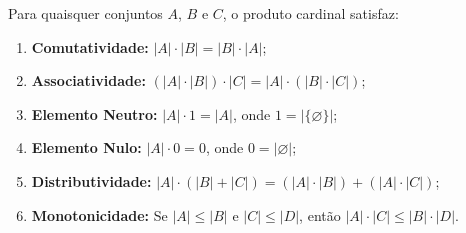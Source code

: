 \begin{proposicao}
    \label{prop:propriedades_produto_cardinal}
    Para quaisquer conjuntos \(A\), \(B\) e \(C\), o produto cardinal satisfaz:
    \begin{enumerate}
        \item \textbf{Comutatividade:} \(|A| \cdot |B| = |B| \cdot |A|\);
        \item \textbf{Associatividade:} \((|A| \cdot |B|) \cdot |C| = |A| \cdot (|B| \cdot |C|)\);
        \item \textbf{Elemento Neutro:} \(|A| \cdot 1 = |A|\), onde \(1 = |\{\varnothing\}|\);
        \item \textbf{Elemento Nulo:} \(|A| \cdot 0 = 0\), onde \(0 = |\varnothing|\);
        \item \textbf{Distributividade:} \(|A| \cdot (|B| + |C|) = (|A| \cdot |B|) + (|A| \cdot |C|)\);
        \item \textbf{Monotonicidade:} Se \(|A| \leq |B|\) e \(|C| \leq |D|\), então \(|A| \cdot |C| \leq |B| \cdot |D|\).
    \end{enumerate}
\end{proposicao}


